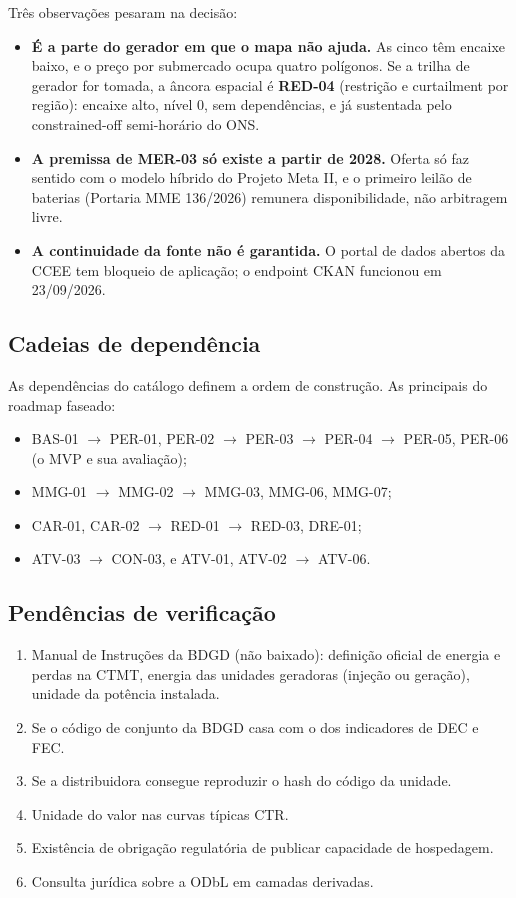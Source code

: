 Três observações pesaram na decisão:
\begin{itemize}
  \item \textbf{É a parte do gerador em que o mapa não ajuda.} As cinco têm
    encaixe baixo, e o preço por submercado ocupa quatro polígonos. Se a trilha
    de gerador for tomada, a âncora espacial é \textbf{RED-04} (restrição e
    curtailment por região): encaixe alto, nível 0, sem dependências, e já
    sustentada pelo constrained-off semi-horário do ONS.
  \item \textbf{A premissa de MER-03 só existe a partir de 2028.} Oferta só faz sentido com
    o modelo híbrido do Projeto Meta II, e o primeiro leilão de baterias
    (Portaria MME 136/2026) remunera disponibilidade, não arbitragem livre.
  \item \textbf{A continuidade da fonte não é garantida.} O portal de dados
    abertos da CCEE tem bloqueio de aplicação; o endpoint CKAN funcionou em
    23/09/2026.
\end{itemize}

\subsection*{Cadeias de dependência}

As dependências do catálogo definem a ordem de construção. As principais do roadmap faseado:
\begin{itemize}
  \item BAS-01 $\rightarrow$ PER-01, PER-02 $\rightarrow$ PER-03 $\rightarrow$
    PER-04 $\rightarrow$ PER-05, PER-06 (o MVP e sua avaliação);
  \item MMG-01 $\rightarrow$ MMG-02 $\rightarrow$ MMG-03, MMG-06, MMG-07;
  \item CAR-01, CAR-02 $\rightarrow$ RED-01 $\rightarrow$ RED-03, DRE-01;
  \item ATV-03 $\rightarrow$ CON-03, e ATV-01, ATV-02 $\rightarrow$ ATV-06.
\end{itemize}

\subsection*{Pendências de verificação}

\begin{enumerate}
  \item Manual de Instruções da BDGD (não baixado): definição oficial de
    energia e perdas na CTMT, energia das unidades geradoras (injeção ou
    geração), unidade da potência instalada.
  \item Se o código de conjunto da BDGD casa com o dos indicadores de DEC e
    FEC.
  \item Se a distribuidora consegue reproduzir o hash do código da unidade.
  \item Unidade do valor nas curvas típicas CTR.
  \item Existência de obrigação regulatória de publicar capacidade de
    hospedagem.
  \item Consulta jurídica sobre a ODbL em camadas derivadas.
\end{enumerate}
